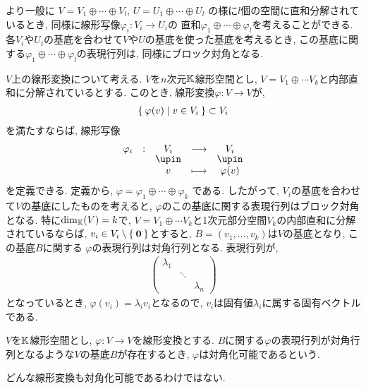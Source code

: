 より一般に
$V=V_1\oplus \cdots \oplus V_l$,
$U=U_1\oplus \cdots \oplus U_l$
の様に$l$個の空間に直和分解されているとき,
同様に線形写像$\varphi_i\colon V_i\to U_i$の
直和$\varphi_1\oplus \cdots \oplus \varphi_l$を考えることができる.
各$V_i$や$U_i$の基底を合わせて$V$や$U$の基底を使った基底を考えるとき,
この基底に関する$\varphi_1\oplus \cdots \oplus \varphi_l$の表現行列は,
同様にブロック対角となる.

$V$上の線形変換について考える.
$V$を$n$次元$\mathbb{K}$線形空間とし,
$V=V_1\oplus \cdots V_k$と内部直和に分解されているとする.
このとき, 線形変換$\varphi\colon V\to V$が,
\begin{align*}
\Set{\varphi(v)|v\in V_i}\subset V_i
\end{align*}
を満たすならば,
線形写像
\begin{align*}
  \shazo{\varphi_i}{V_i}{V_i}
  {v}{\varphi(v)}
\end{align*}
を定義できる.
定義から, $\varphi=\varphi_1\oplus \cdots \oplus \varphi_k$
である.
したがって, $V_i$の基底を合わせて$V$の基底にしたものを考えると,
$\varphi$のこの基底に関する表現行列はブロック対角となる.
特に$\dim_{\mathbb{K}}(V)=k$で, 
$V=V_1\oplus \cdots V_k$と1次元部分空間$V_k$の内部直和に分解されているならば,
$v_i\in V_i\setminus \Set{\boldsymbol{0}}$とすると,
$B=(v_1,\ldots,v_k)$は$V$の基底となり,
この基底$B$に関する
$\varphi$の表現行列は対角行列となる.
表現行列が,
\begin{align*}
\begin{pmatrix}\lambda_1&&\\&\ddots&\\&&\lambda_n\end{pmatrix}
\end{align*}
となっているとき, $\varphi(v_i)=\lambda_iv_i$となるので,
$v_i$は固有値$\lambda_i$に属する固有ベクトルである.

\begin{definition}
  $V$を$\mathbb{K}$線形空間とし,
  $\varphi\colon V\to V$を線形変換とする.
  $B$に関する$\varphi$の表現行列が対角行列となるような$V$の基底$B$が存在するとき,
  $\varphi$は対角化可能であるという.
\end{definition}
\begin{remark}
  どんな線形変換も対角化可能であるわけではない.
\end{remark}

